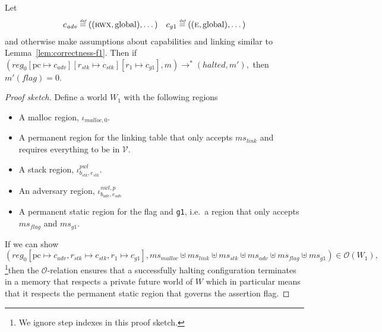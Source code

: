 \documentclass[format=acmsmall, review=true, screen=true]{acmart}
\newcommand{\update}[2]{[#1 \mapsto #2]}
\newcommand{\defeq}{\stackrel{\textit{\tiny{def}}}{=}}
\newcommand{\var}[1]{\mathit{#1}}
\newcommand{\hs}{\var{ms}}
\newcommand{\ms}{\hs}
\newcommand{\pcreg}{\mathrm{pc}}
\newcommand{\reg}{\var{reg}}
\newcommand{\adv}{\var{adv}}
\newcommand{\link}{\var{link}}
\newcommand{\stk}{\var{stk}}
\newcommand{\flag}{\var{flag}}
\newcommand{\nwl}{\var{nwl}}
\newcommand{\pwl}{\var{pwl}}
\newcommand{\halted}{\mathit{halted}}
\newcommand{\codelabel}[1]{\mathit{#1}}
\newcommand{\malloc}{\codelabel{malloc}}
\newcommand{\asmType}{\plaindom{AsmType}}
\newcommand{\plaindom}[1]{\mathrm{#1}}
\newcommand{\intr}[2]{\mathcal{#1}}
\newcommand{\valueintr}[1]{\intr{V}{#1}}
\newcommand{\stdvr}{\valueintr{\asmType}}
\newcommand{\observations}{\mathcal{O}}
\newcommand{\plainperm}[1]{\textsc{#1}}
\newcommand{\entry}{\plainperm{e}}
\newcommand{\rwx}{\plainperm{rwx}}
\newcommand{\plainlocality}[1]{\mathrm{#1}}
\newcommand{\glob}{\plainlocality{global}}
\newcommand{\step}[1][]{\rightarrow_{#1}}
\newenvironment{toplas}{}{}
\begin{document}
\begin{lemma}
  \label{lem:correctness-g1}
  Let
\[
    \begin{array}{r@{}lr@{}l}
    c_{\var{adv}} & \;\defeq ((\rwx,\glob),\dots) & c_{g1} & \;\defeq ((\entry,\glob),\dots)
    \end{array}
\]
  and otherwise make assumptions about capabilities and linking similar to Lemma~\ref{lem:correctness-f1}.
  Then if $
  (\reg_0\update{\pcreg}{c_\adv}\update{r_\stk}{c_\stk}\update{r_1}{c_{g1}},m) \step^* (\halted,m'),$
  then $m'(\flag) = 0$.
\end{lemma}
\begin{toplas}
  \begin{proof}[Proof sketch]
    Define a world $W_1$ with the following regions
    \begin{itemize}
    \item A malloc region, $\iota_{\malloc,0}$.
    \item A permanent region for the linking table that only accepts $\ms_\link$ and requires everything to be in $\stdvr$.
    \item A stack region, $\iota^{\pwl}_{b_\stk,e_\stk}$.
    \item An adversary region, $\iota^{\nwl,p}_{b_\adv,e_\adv}$
    \item A permanent static region for the flag and \texttt{g1}, i.e.\ a region that only
      accepts $\ms_\flag$ and $\ms_{g1}$.
    \end{itemize}
    If we can show
    \begin{equation}
      (\reg_0[\pcreg \mapsto c_\adv,r_\stk\mapsto c_\stk,r_1\mapsto c_{g1}],\ms_\malloc \uplus \ms_\link \uplus \ms_\stk \uplus \ms_\adv\uplus \ms_\flag  \uplus \ms_{g1}) \in \observations(W_1),\label{eq:g1:main-O-res}
  \end{equation}
  \footnote{We ignore step indexes in this proof sketch.}then the $\observations$-relation ensures that a successfully halting configuration terminates in a memory that respects a private future world of $W$ which in particular means that it respects the permanent static region that governs the assertion flag.


\end{proof}
\end{toplas}
\end{document}
